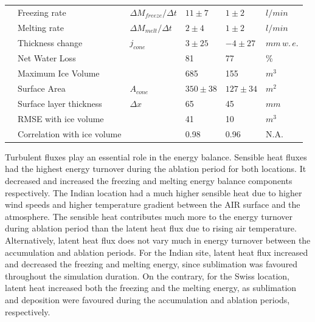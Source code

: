 \documentclass[utf8]{frontiersSCNS}
\begin{document}
\begin{table}
\begin{tabular}{@{}|llllll|@{}}
		                       & Freezing rate                   & ${\Delta M_{freeze}}/{\Delta t}$    & $11 \pm 7$    & $1 \pm 2$     & $l/min$ \\
		\multicolumn{1}{|l|}{} & Melting rate                    & ${\Delta M_{melt}}/{\Delta t}$      & $2 \pm 4$     & $1 \pm 2$     & $l/min$ \\
		\multicolumn{1}{|l|}{} & Thickness change                & $j_{cone}$      & $3 \pm 25$    & $-4 \pm 27$   &
		$mm \, w.\,e.$                                                                                                       \\
		\multicolumn{1}{|l|}{} & Net Water Loss                  &                 & 81            & 77
		                       & \%                                                                                          \\
		\multicolumn{1}{|l|}{} & Maximum Ice Volume              &                 & 685           & 155           & $m^{3}$ \\
		\multicolumn{1}{|l|}{} & Surface Area                    & $A_{cone}$      & $350 \pm 38$  & $127 \pm 34$  & $m^{2}$ \\\midrule
		\multicolumn{1}{|l|}{\multirow{3}{*}{\rotatebox[origin=c]{90}{Model}}}
		                       & Surface layer thickness & $\Delta x$ & 65          & 45            &                $mm$  \\
		\multicolumn{1}{|l|}{} & RMSE with ice volume        &                 & 41            & 10           & $m^{3}$ \\
		\multicolumn{1}{|l|}{} & Correlation with ice volume &                 & 0.98          & 0.96          &
		N.A.                                                                                                                 \\\bottomrule
	\end{tabular}
\end{table}

Turbulent fluxes play an essential role in the energy balance. Sensible heat fluxes had the highest energy
turnover during the ablation period for both locations. It decreased and increased the freezing and melting
energy balance components respectively. The Indian location had a much higher sensible heat due to higher wind speeds and
higher temperature gradient between the AIR surface and the atmosphere. The sensible heat contributes much more
to the energy turnover during ablation period than the latent heat flux due to rising air temperature. Alternatively, latent
heat flux does not vary much in energy turnover between the accumulation and ablation periods. For the Indian
site, latent heat flux increased and decreased the freezing and melting energy, since sublimation was
favoured throughout the simulation duration. On the contrary, for the Swiss location, latent heat increased both the freezing
and the melting energy, as sublimation and deposition were favoured during the accumulation and ablation
periods, respectively.
\end{document}
